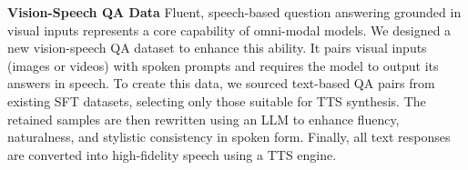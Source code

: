 \documentclass{article}
\begin{document}




\textbf{Vision-Speech QA Data} %
Fluent, speech-based question answering grounded in visual inputs represents a core capability of omni-modal models.     We designed a new vision-speech QA dataset to enhance this ability. It pairs visual inputs (images or videos) with spoken prompts and requires the model to output its answers in speech. To create this data, we sourced text-based QA pairs from existing SFT datasets, selecting only those suitable for TTS synthesis. The retained samples are then rewritten using an LLM to enhance fluency, naturalness, and stylistic consistency in spoken form. Finally, all text responses are converted into high-fidelity speech using a TTS engine.
\end{document}
